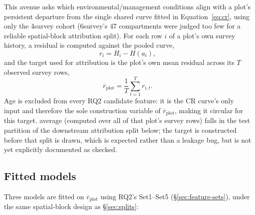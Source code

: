 This avenue asks which environmental/management conditions align with a plot's persistent
departure from the single shared curve fitted in Equation~\ref{eq:cr}, using only the 4survey
cohort (6survey's 47 compartments were judged too few for a reliable spatial-block attribution
split). For each row $i$ of a plot's own survey history, a residual is computed against the
pooled curve,
\begin{equation}
r_i = H_i - H(a_i),
\label{eq:cr-residual}
\end{equation}
and the target used for attribution is the plot's own mean residual across its $T$ observed
survey rows,
\begin{equation}
\overline{r}_{\text{plot}} = \frac{1}{T}\sum_{t=1}^{T} r_{i,t}.
\label{eq:mean-cr-residual}
\end{equation}
Age is excluded from every RQ2 candidate feature: it is the CR curve's only input and therefore
the sole construction variable of $\overline{r}_{\text{plot}}$, making it circular for this
target. %
average (computed over all of that plot's survey rows) falls in the test partition of the
downstream attribution split below; the target is constructed before that split is drawn, which
is expected rather than a leakage bug, but is not yet explicitly documented as checked.

\subsection{Fitted models}

Three models are fitted on $\overline{r}_{\text{plot}}$ using RQ2's Set1--Set5
(\S\ref{sec:feature-sets}), under the same spatial-block design as \S\ref{sec:splits}:

